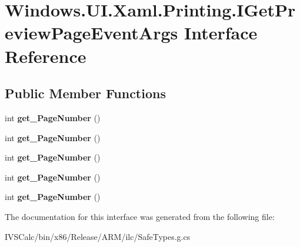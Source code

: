 \hypertarget{interface_windows_1_1_u_i_1_1_xaml_1_1_printing_1_1_i_get_preview_page_event_args}{}\section{Windows.\+U\+I.\+Xaml.\+Printing.\+I\+Get\+Preview\+Page\+Event\+Args Interface Reference}
\label{interface_windows_1_1_u_i_1_1_xaml_1_1_printing_1_1_i_get_preview_page_event_args}
\subsection*{Public Member Functions}
\begin{DoxyCompactItemize}
\item 
\mbox{\label{interface_windows_1_1_u_i_1_1_xaml_1_1_printing_1_1_i_get_preview_page_event_args_aba2179409e4acd59ba09311dc5fd3bd7}} 
int {\bfseries get\+\_\+\+Page\+Number} ()
\item 
\mbox{\label{interface_windows_1_1_u_i_1_1_xaml_1_1_printing_1_1_i_get_preview_page_event_args_aba2179409e4acd59ba09311dc5fd3bd7}} 
int {\bfseries get\+\_\+\+Page\+Number} ()
\item 
\mbox{\label{interface_windows_1_1_u_i_1_1_xaml_1_1_printing_1_1_i_get_preview_page_event_args_aba2179409e4acd59ba09311dc5fd3bd7}} 
int {\bfseries get\+\_\+\+Page\+Number} ()
\item 
\mbox{\label{interface_windows_1_1_u_i_1_1_xaml_1_1_printing_1_1_i_get_preview_page_event_args_aba2179409e4acd59ba09311dc5fd3bd7}} 
int {\bfseries get\+\_\+\+Page\+Number} ()
\item 
\mbox{\label{interface_windows_1_1_u_i_1_1_xaml_1_1_printing_1_1_i_get_preview_page_event_args_aba2179409e4acd59ba09311dc5fd3bd7}} 
int {\bfseries get\+\_\+\+Page\+Number} ()
\end{DoxyCompactItemize}


The documentation for this interface was generated from the following file\+:\begin{DoxyCompactItemize}
\item 
I\+V\+S\+Calc/bin/x86/\+Release/\+A\+R\+M/ilc/Safe\+Types.\+g.\+cs\end{DoxyCompactItemize}

